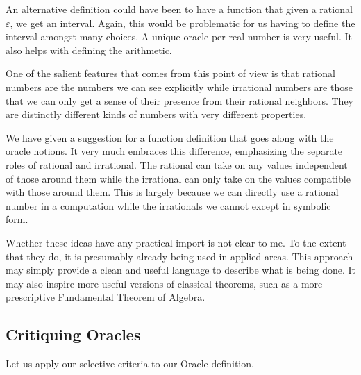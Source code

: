 \documentclass[12pt]{article}
\theoremstyle{remark}
\begin{document}
An alternative definition could have been to have a function that given a rational $\varepsilon$, we get an interval. Again, this would be problematic for us having to define the interval amongst many choices. A unique oracle per real number is very useful. It also helps with defining the arithmetic. 

One of the salient features that comes from this point of view is that rational numbers are the numbers we can see explicitly while irrational numbers are those that we can only get a sense of their presence from their rational neighbors. They are distinctly different kinds of numbers with very different properties. 

We have given a suggestion for a function definition that goes along with the oracle notions. It very much embraces this difference, emphasizing the separate roles of rational and irrational. The rational can take on any values independent of those around them while the irrational can only take on the values compatible with those around them. This is largely because we can directly use a rational number in a computation while the irrationals we cannot except in symbolic form. 

Whether these ideas have any practical import is not clear to me. To the extent that they do, it is presumably already being used in applied areas. This approach may simply provide a clean and useful language to describe what is being done. It may also inspire more useful versions of classical theorems, such as a more prescriptive Fundamental Theorem of Algebra. 

\subsection{Critiquing Oracles}

Let us apply our selective criteria to our Oracle definition. 
\end{document}
